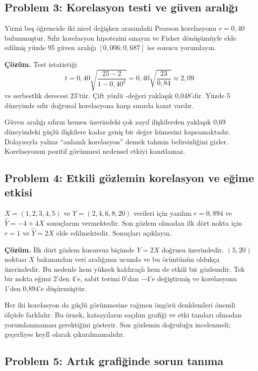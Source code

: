\subsection*{Problem 3: Korelasyon testi ve güven aralığı}

Yirmi beş öğrencide iki nicel değişken arasındaki Pearson korelasyonu
$r=0{,}40$ bulunmuştur. Sıfır korelasyon hipotezini sınayın ve Fisher
dönüşümüyle elde edilmiş yüzde 95 güven aralığı $[0{,}006;0{,}687]$ ise
sonucu yorumlayın.

\textbf{Çözüm.} Test istatistiği
\[
t=0{,}40\sqrt{\frac{25-2}{1-0{,}40^2}}
=0{,}40\sqrt{\frac{23}{0{,}84}}\approx2{,}09
\]
ve serbestlik derecesi 23'tür. Çift yönlü \pval-değeri yaklaşık 0,048'dir.
Yüzde 5 düzeyinde sıfır doğrusal korelasyona karşı sınırda kanıt vardır.

Güven aralığı sıfırın hemen üzerindeki çok zayıf ilişkilerden yaklaşık 0,69
düzeyindeki güçlü ilişkilere kadar geniş bir değer kümesini kapsamaktadır.
Dolayısıyla yalnız ``anlamlı korelasyon'' demek tahmin belirsizliğini gizler.
Korelasyonun pozitif görünmesi nedensel etkiyi kanıtlamaz.

\subsection*{Problem 4: Etkili gözlemin korelasyon ve eğime etkisi}

$X=(1,2,3,4,5)$ ve $Y=(2,4,6,8,20)$ verileri için yazılım
$r=0{,}894$ ve $\hat Y=-4+4X$ sonuçlarını vermektedir. Son gözlem olmadan ilk
dört nokta için $r=1$ ve $\hat Y=2X$ elde edilmektedir. Sonuçları açıklayın.

\textbf{Çözüm.} İlk dört gözlem kusursuz biçimde $Y=2X$ doğrusu üzerindedir.
$(5,20)$ noktası $X$ bakımından veri aralığının ucunda ve bu örüntünün
oldukça üzerindedir. Bu nedenle hem yüksek kaldıraçlı hem de etkili bir
gözlemdir. Tek bir nokta eğimi 2'den 4'e, sabit terimi 0'dan $-4$'e
değiştirmiş ve korelasyonu 1'den 0,894'e düşürmüştür.

Her iki korelasyon da güçlü görünmesine rağmen öngörü denklemleri önemli
ölçüde farklıdır. Bu örnek, katsayıların saçılım grafiği ve etki tanıları
olmadan yorumlanmaması gerektiğini gösterir. Son gözlemin doğruluğu
incelenmeli; geçerliyse keyfî olarak çıkarılmamalıdır.

\subsection*{Problem 5: Artık grafiğinde sorun tanıma}


